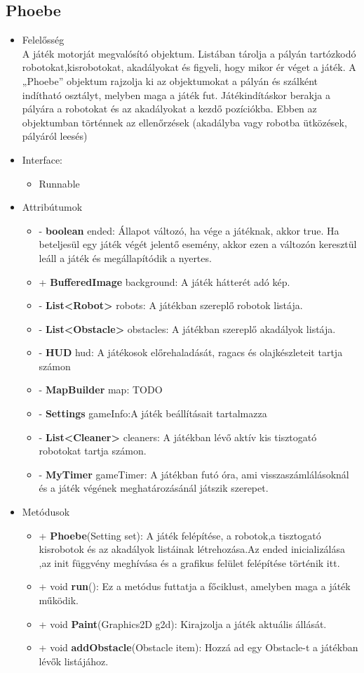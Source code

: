 \subsection{Phoebe}
\begin{itemize}
\item Felelősség\\
A játék motorját megvalósító objektum. Listában tárolja a pályán tartózkodó robotokat,kisrobotokat, akadályokat és 
 figyeli, hogy mikor ér véget a játék. A „Phoebe” objektum rajzolja ki az objektumokat a pályán és 
 szálként indítható osztályt, melyben maga a játék fut. Játékindításkor berakja a pályára a robotokat és 
 az akadályokat a kezdő pozíciókba. Ebben az objektumban történnek az ellenőrzések (akadályba vagy 
  robotba ütközések, pályáról leesés)
  \item Interface:
  \begin{itemize}
  \item Runnable
  \end{itemize}
\item Attribútumok
	\begin{itemize}
		\item- \textbf{boolean} ended: Állapot változó, ha vége a játéknak, akkor true. Ha beteljesül egy játék végét jelentő esemény, akkor ezen a változón keresztül leáll a játék és megállapítódik a nyertes.
		\item+ \textbf{BufferedImage} background: A játék hátterét adó kép.
		\item- \textbf{List<Robot>} robots: A játékban szereplő robotok listája.
		\item- \textbf{List<Obstacle>} obstacles: A játékban szereplő akadályok listája.
		\item- \textbf{HUD} hud: A játékosok előrehaladását, ragacs és olajkészleteit tartja számon
		\item- \textbf{MapBuilder} map: TODO
		\item- \textbf{Settings} gameInfo:A játék beállításait tartalmazza         \item- \textbf{List<Cleaner>} cleaners: A játékban lévő aktív kis tisztogató robotokat tartja számon.
        \item- \textbf{MyTimer} gameTimer: A játékban futó óra, ami visszaszámlálásoknál és a játék végének meghatározásánál játszik szerepet.

		
			
	\end{itemize}
\item Metódusok
	\begin{itemize}
		\item+ \textbf{Phoebe}(Setting set): A játék felépítése, a robotok,a tisztogató kisrobotok és  az akadályok listáinak létrehozása.Az ended inicializálása ,az init függvény meghívása és a grafikus felület felépítése történik itt.
		\item+ void \textbf{run}(): Ez a metódus futtatja a főciklust, amelyben maga a játék működik.
	\item+ void \textbf{Paint}(Graphics2D g2d): Kirajzolja a játék aktuális állását. 
	\item+ void \textbf{addObstacle}(Obstacle item): Hozzá ad egy Obstacle-t a játékban lévők listájához.
	

\end{itemize}
\end{itemize}
